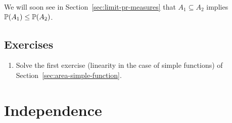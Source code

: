 \documentclass{article}
\begin{document}
We will soon see in Section~\ref{sec:limit-pr-measures} that $A_1 \subseteq A_2$ implies $\P(A_1) \le \P(A_2)$.


\subsection{Exercises}

\begin{enumerate}
  \item Solve the first exercise (linearity in the case of simple functions) of Section~\ref{sec:area-simple-function}.
\end{enumerate}


%


\section{Independence}
\end{document}
